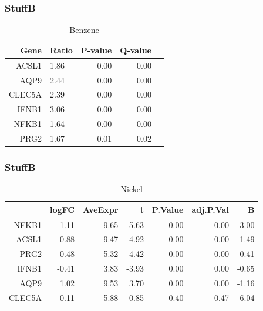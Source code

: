 \documentclass{beamer}
\begin{document}
\begin{frame}[fragile]
  	\frametitle{StuffB}
 		\begin{table}[ht]
		\caption {Benzene} \label{tab:benzene} 
		\centering
		\begin{tabular}{rlrrr}
  			\hline
 			Gene & Ratio & P-value & Q-value \\ 
  			\hline
			ACSL1 & 1.86 & 0.00 & 0.00 \\ 
  			AQP9 & 2.44 & 0.00 & 0.00 \\ 
  			CLEC5A & 2.39 & 0.00 & 0.00 \\ 
  			IFNB1 & 3.06 & 0.00 & 0.00 \\ 
  			NFKB1 & 1.64 & 0.00 & 0.00 \\ 
  			PRG2 & 1.67 & 0.01 & 0.02 \\ 
   			\hline
		\end{tabular}
		\end{table}
\end{frame}


\begin{frame}[fragile]
  	\frametitle{StuffB}
 		\begin{table}[ht]
		\caption {Nickel} \label{tab:nickel} 
		\centering
		\begin{tabular}{rrrrrrr}
 			\hline
 			& logFC & AveExpr & t & P.Value & adj.P.Val & B \\ 
  			\hline
			NFKB1 & 1.11 & 9.65 & 5.63 & 0.00 & 0.00 & 3.00 \\ 
  			ACSL1 & 0.88 & 9.47 & 4.92 & 0.00 & 0.00 & 1.49 \\ 
  			PRG2 & -0.48 & 5.32 & -4.42 & 0.00 & 0.00 & 0.41 \\ 
  			IFNB1 & -0.41 & 3.83 & -3.93 & 0.00 & 0.00 & -0.65 \\ 
  			AQP9 & 1.02 & 9.53 & 3.70 & 0.00 & 0.00 & -1.16 \\ 
  			CLEC5A & -0.11 & 5.88 & -0.85 & 0.40 & 0.47 & -6.04 \\ 
  			 \hline
		\end{tabular}
		\end{table}
\end{frame}
\end{document}
